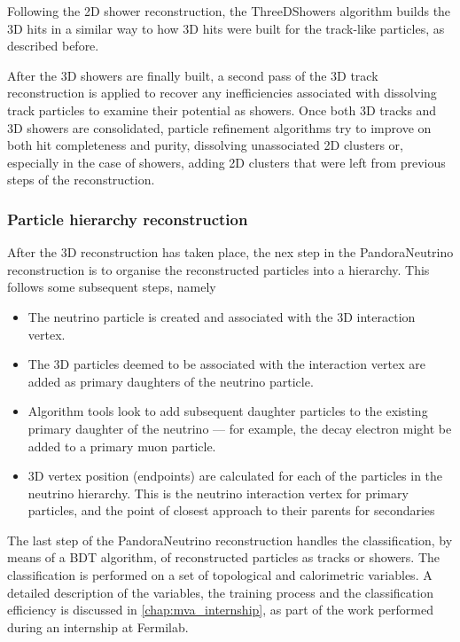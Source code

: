 Following the 2D shower reconstruction, the ThreeDShowers algorithm builds the 3D hits in a similar way to how 3D hits were built for the track-like particles, as described before. 

After the 3D showers are finally built, a second pass of the 3D track reconstruction is applied to recover any inefficiencies associated with dissolving track particles to examine their potential as showers. Once both 3D tracks and 3D showers are consolidated, particle refinement algorithms try to improve on both hit completeness and purity, dissolving unassociated 2D clusters or, especially in the case of showers, adding 2D clusters that were left from previous steps of the reconstruction. 

\subsubsection{Particle hierarchy reconstruction}

After the 3D reconstruction has taken place, the nex step in the PandoraNeutrino reconstruction is to organise the reconstructed particles into a hierarchy. This follows some subsequent steps, namely \begin{itemize}
    \item The neutrino particle is created and associated with the 3D interaction vertex.
    \item The 3D particles deemed to be associated with the interaction vertex are added as primary daughters of the neutrino particle.
    \item Algorithm tools look to add subsequent daughter particles to the existing primary daughter of the neutrino --- for example, the decay electron might be added to a primary muon particle. 
    \item 3D vertex position (endpoints) are calculated for each of the particles in the neutrino hierarchy. This is the neutrino interaction vertex for primary particles, and the point of closest approach to their parents for secondaries
\end{itemize}

The last step of the PandoraNeutrino reconstruction handles the classification, by means of a BDT algorithm, of reconstructed particles as tracks or showers. The classification is performed on a set of topological and calorimetric variables. A detailed description of the variables, the training process and the classification efficiency is discussed in \autoref{chap:mva_internship}, as part of the work performed during an internship at Fermilab. 

